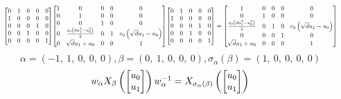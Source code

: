 \documentclass[11pt]{article}
\theoremstyle{definition}
\begin{document}
\[
\scaletoalign{\textwidth}{{\left[\begin{matrix}0 & 1 & 0 & 0 & 0\\1 & 0 & 0 & 0 & 0\\0 & 0 & 0 & 1 & 0\\0 & 0 & 1 & 0 & 0\\0 & 0 & 0 & 0 & 1\end{matrix}\right]} {\left[\begin{matrix}1 & 0 & 0 & 0 & 0\\0 & 1 & 0 & 0 & 0\\0 & 0 & 1 & 0 & 0\\0 & \frac{c_{0} \left(d u_{1}^{2} - u_{0}^{2}\right)}{2} & 0 & 1 & c_{0} \left(\sqrt{d} u_{1} - u_{0}\right)\\0 & \sqrt{d} u_{1} + u_{0} & 0 & 0 & 1\end{matrix}\right]} {\left[\begin{matrix}0 & 1 & 0 & 0 & 0\\1 & 0 & 0 & 0 & 0\\0 & 0 & 0 & 1 & 0\\0 & 0 & 1 & 0 & 0\\0 & 0 & 0 & 0 & 1\end{matrix}\right]} = {\left[\begin{matrix}1 & 0 & 0 & 0 & 0\\0 & 1 & 0 & 0 & 0\\\frac{c_{0} \left(d u_{1}^{2} - u_{0}^{2}\right)}{2} & 0 & 1 & 0 & c_{0} \left(\sqrt{d} u_{1} - u_{0}\right)\\0 & 0 & 0 & 1 & 0\\\sqrt{d} u_{1} + u_{0} & 0 & 0 & 0 & 1\end{matrix}\right]}}
\]
\[
\alpha = \left( -1, \  1, \  0, \  0, \  0\right), \beta = \left( 0, \  1, \  0, \  0, \  0\right), \sigma_{\alpha}(\beta) = \left( 1, \  0, \  0, \  0, \  0\right)
\]
\[
\scaletoalign{\textwidth}{w_{\alpha} X_{\beta}\left(\left[\begin{matrix}u_{0}\\u_{1}\end{matrix}\right]\right) w_{\alpha}^{-1} = X_{\sigma_{\alpha}\left(\beta\right)}\left(\left[\begin{matrix}u_{0}\\u_{1}\end{matrix}\right]\right)}
\]
\end{document}
